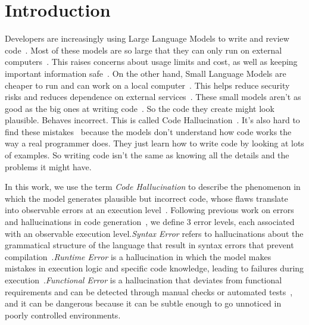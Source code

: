 \section{Introduction}

Developers are increasingly using Large Language Models to write and review code~\citep{lee2025hallucination,MAHADEHASAN2026112815}. Most of these models are so large that they can only run on external computers~\citep{nguyen2026noirprivacypreservinggenerationcode}. This raises concerns about usage limits and cost, as well as keeping important information safe~\citep{nguyen2026noirprivacypreservinggenerationcode,shen2025gpiot}. On the other hand, Small Language Models are cheaper to run and can work on a local computer~\citep{MAHADEHASAN2026112815,shen2025gpiot}. This helps reduce security risks and reduces dependence on external services~\citep{nguyen2026noirprivacypreservinggenerationcode,shen2025gpiot}. These small models aren't as good as the big ones at writing code~\citep{MAHADEHASAN2026112815}. So the code they create might look plausible. Behaves incorrect. This is called Code Hallucination~\citep{pavel2025hallucination,lee2025hallucination,tian2025codehalu}. It's also hard to find these mistakes~\citep{andriushchenko-etal-2026-efficient,lee2025hallucination} because the models don't understand how code works the way a real programmer does. They just learn how to write code by looking at lots of examples. So writing code isn't the same as knowing all the details and the problems it might have.

In this work, we use the term \emph{Code Hallucination} to describe the phenomenon in which the model generates plausible but incorrect code, whose flaws translate into observable errors at an execution level~\citep{pavel2025hallucination,lee2025hallucination,tian2025codehalu}. Following previous work on errors and hallucinations in code generation~\citep{lee2025hallucination,dou2025whatswrong,tian2025codehalu}, we define 3 error levels, each associated with an observable execution level.\emph{Syntax Error} refers to hallucinations about the grammatical structure of the language that result in syntax errors that prevent compilation~\citep{lee2025hallucination,dou2025whatswrong}.\emph{Runtime Error} is a hallucination in which the model makes mistakes in execution logic and specific code knowledge, leading to failures during execution~\citep{lee2025hallucination,dou2025whatswrong}.\emph{Functional Error} is a hallucination that deviates from functional requirements and can be detected through manual checks or automated tests~\citep{lee2025hallucination,dou2025whatswrong,tian2025codehalu}, and it can be dangerous because it can be subtle enough to go unnoticed in poorly controlled environments.

